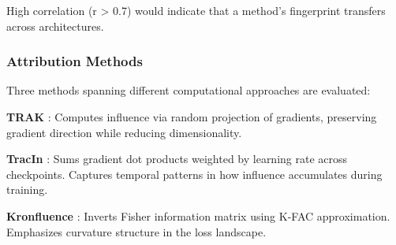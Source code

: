 High correlation (r > 0.7) would indicate that a method's fingerprint transfers across architectures.

\subsubsection{Attribution Methods}

Three methods spanning different computational approaches are evaluated:

\textbf{TRAK} \citep{park2023trak}: Computes influence via random projection of gradients, preserving gradient direction while reducing dimensionality.

\textbf{TracIn} \citep{pruthi2020tracin}: Sums gradient dot products weighted by learning rate across checkpoints. Captures temporal patterns in how influence accumulates during training.

\textbf{Kronfluence} \citep{grosse2023kronfluence}: Inverts Fisher information matrix using K-FAC approximation. Emphasizes curvature structure in the loss landscape.
